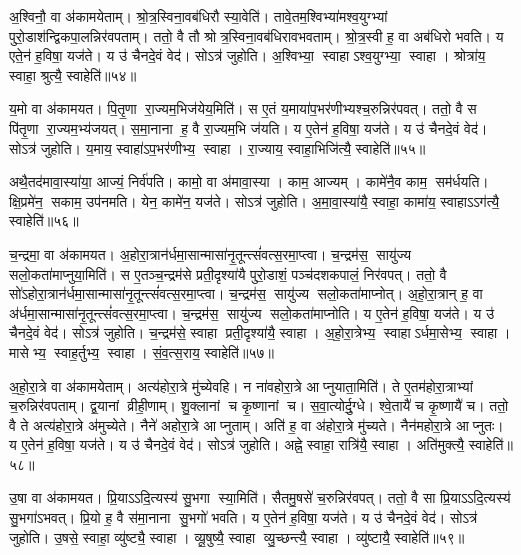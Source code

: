 अ॒श्विनौ॒ वा अ॑कामयेताम्।
श्रो॒त्र॒स्विना॒वब॑धिरौ स्या॒वेति॑।
तावे॒तम॒श्विभ्या॑मश्व॒युग्भ्यां पुरो॒डाश॑न्द्विकपा॒लन्निर॑वपताम्।
ततो॒ वै तौ श्रोत्र॒स्विना॒वब॑धिरावभवताम्।
श्रो॒त्र॒स्वी ह॒ वा अब॑धिरो भवति।
य एते॒न॑ ह॒विषा॒ यज॑ते।
य उ॑ चैनदे॒वं वेद॑।
सोऽत्र॑ जुहोति।
अ॒श्विभ्या॒ स्वाहाऽश्व॒युग्भ्या॒ स्वाहा।
श्रोत्रा॑य॒ स्वाहा॒ श्रुत्यै॒ स्वाहेति॑॥५४॥

य॒मो वा अ॑कामयत।
पि॒तृ॒णा रा॒ज्यम॒भिज॑येय॒मिति॑।
स ए॒तं य॒माया॑प॒भर॑णीभ्यश्च॒रुन्निर॑पवत्।
ततो॒ वै स पि॑तृ॒णा रा॒ज्यम॒भ्य॑जयत्।
स॒मा॒नाना ह॒ वै रा॒ज्यम॒भि ज॑यति।
य ए॒तेन॑ ह॒विषा॒ यज॑ते।
य उ॑ चैनदे॒वं वेद॑।
सोऽत्र॑ जुहोति।
य॒माय॒ स्वाहा॑ऽप॒भर॑णीभ्य॒ स्वाहा।
रा॒ज्याय॒ स्वाहा॒भिजि॑त्यै॒ स्वाहेति॑॥५५॥

अथै॒तद॑मावा॒स्या॑या॒ आज्यं॒ निर्व॑पति।
कामो॒ वा अ॑मावा॒स्या।
काम॒ आज्यम्।
कामे॑नै॒व काम॒ सम॑र्धयति।
क्षि॒प्रमे॑न॒ सकाम॒ उप॑नमति।
येन॒ कामे॑न॒ यज॑ते।
सोऽत्र॑ जुहोति।
अ॒मा॒वा॒स्या॑यै॒ स्वाहा॒ कामा॑य॒ स्वाहाऽऽग॑त्यै॒ स्वाहेति॑॥५६॥\anuvakamend[मि॒त्र इन्द्र॑ प्र॒जाप॑ति॒र्दश॑ द॒शाप॒ एका॑दश॒ विश्वे॒ ब्रह्म॒ दश॑दश॒ विष्णु॒स्त्रयो॑दश॒ वस॑व॒ इन्द्रो॒ऽजोऽहि॒र्वै बु॒ध्निय॑ पू॒षाऽश्विनौ॑ य॒मो दश॑ द॒शाथै॒तद॑मावा॒स्या॑या अ॒ष्टौ पञ्च॑दश]

च॒न्द्रमा॒ वा अ॑कामयत।
अ॒होरा॒त्रान॑र्धमा॒सान्मासा॑नृ॒तून्त्सं॑वत्स॒रमा॒प्त्वा।
च॒न्द्रम॑स॒ सायु॑ज्य सलो॒कता॑माप्नुया॒मिति॑।
स ए॒तञ्च॒न्द्रम॑से प्रती॒दृश्या॑यै पुरो॒डाशं॒ पञ्च॑दशकपालं॒ निर॑वपत्।
ततो॒ वै सो॑ऽहोरा॒त्रान॑र्धमा॒सान्मासा॑नृ॒तून्त्सं॑वत्स॒रमा॒प्त्वा।
च॒न्द्रम॑स॒ सायु॑ज्य सलो॒कता॑माप्नोत्।
अ॒हो॒रा॒त्रान् ह॒ वा अ॑र्धमा॒सान्मासा॑नृ॒तून्त्सं॑वत्स॒रमा॒प्त्वा।
च॒न्द्रम॑स॒ सायु॑ज्य सलो॒कता॑माप्नोति।
य ए॒तेन॑ ह॒विषा॒ यज॑ते।
य उ॑ चैनदे॒वं वेद॑।
सोऽत्र॑ जुहोति।
च॒न्द्रम॑से॒ स्वाहा प्रती॒दृश्या॑यै॒ स्वाहा।
अ॒हो॒रा॒त्रेभ्य॒ स्वाहाऽर्धमा॒सेभ्य॒ स्वाहा।
मासेभ्य॒ स्वाह॒र्तुभ्य॒ स्वाहा।
सं॒व॒त्स॒राय॒ स्वाहेति॑॥५७॥

अ॒हो॒रा॒त्रे वा अ॑कामयेताम्।
अत्य॑होरा॒त्रे मु॑च्येवहि।
न ना॑वहोरा॒त्रे आप्नुयाता॒मिति॑।
ते ए॒तम॑होरा॒त्राभ्यां च॒रुन्निर॑वपताम्।
द्व॒यानां व्रीही॒णाम्।
शु॒क्लानां च कृ॒ष्णानां च।
स॒वा॒त्योर्दु॒ग्धे।
श्वे॒तायै॑ च कृ॒ष्णायै॑ च।
ततो॒ वै ते अत्य॑होरा॒त्रे अ॑मुच्येते।
नैने॑ अहोरा॒त्रे आप्नुताम्।
अति॑ ह॒ वा अ॑होरा॒त्रे मु॑च्यते।
नैन॑महोरा॒त्रे आप्नुतः।
य ए॒तेन॑ ह॒विषा॒ यज॑ते।
य उ॑ चैनदे॒वं वेद॑।
सोऽत्र॑ जुहोति।
अह्ने॒ स्वाहा॒ रात्रि॑यै॒ स्वाहा।
अति॑मुक्त्यै॒ स्वाहेति॑॥५८॥

उ॒षा वा अ॑कामयत।
प्रि॒याऽऽदि॒त्यस्य॑ सु॒भगा स्या॒मिति॑।
सैतमु॒षसे॑ च॒रुन्निर॑वपत्।
ततो॒ वै सा प्रि॒याऽऽदि॒त्यस्य॑ सु॒भगा॑ऽभवत्।
प्रि॒यो ह॒ वै स॑मा॒नाना सु॒भगो॑ भवति।
य ए॒तेन॑ ह॒विषा॒ यज॑ते।
य उ॑ चैनदे॒वं वेद॑।
सोऽत्र॑ जुहोति।
उ॒षसे॒ स्वाहा॒ व्यु॑ष्ट्यै॒ स्वाहा।
व्यू॒षुष्यै॒ स्वाहा व्यु॒च्छन्त्यै॒ स्वाहा।
व्यु॑ष्टायै॒ स्वाहेति॑॥५९॥

